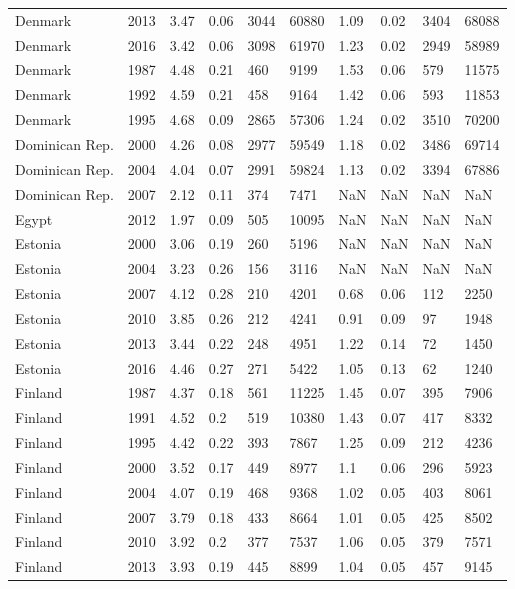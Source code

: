 \begin{tabular}{llllllllll}
Denmark & 2013 & 3.47 & 0.06 & 3044 & 60880 & 1.09 & 0.02 & 3404 & 68088 \\ 
Denmark & 2016 & 3.42 & 0.06 & 3098 & 61970 & 1.23 & 0.02 & 2949 & 58989 \\ 
Denmark & 1987 & 4.48 & 0.21 & 460 & 9199 & 1.53 & 0.06 & 579 & 11575 \\ 
Denmark & 1992 & 4.59 & 0.21 & 458 & 9164 & 1.42 & 0.06 & 593 & 11853 \\ 
Denmark & 1995 & 4.68 & 0.09 & 2865 & 57306 & 1.24 & 0.02 & 3510 & 70200 \\ 
Dominican Rep. & 2000 & 4.26 & 0.08 & 2977 & 59549 & 1.18 & 0.02 & 3486 & 69714 \\ 
Dominican Rep. & 2004 & 4.04 & 0.07 & 2991 & 59824 & 1.13 & 0.02 & 3394 & 67886 \\ 
Dominican Rep. & 2007 & 2.12 & 0.11 & 374 & 7471 & NaN & NaN & NaN & NaN \\ 
Egypt & 2012 & 1.97 & 0.09 & 505 & 10095 & NaN & NaN & NaN & NaN \\ 
Estonia & 2000 & 3.06 & 0.19 & 260 & 5196 & NaN & NaN & NaN & NaN \\ 
Estonia & 2004 & 3.23 & 0.26 & 156 & 3116 & NaN & NaN & NaN & NaN \\ 
Estonia & 2007 & 4.12 & 0.28 & 210 & 4201 & 0.68 & 0.06 & 112 & 2250 \\ 
Estonia & 2010 & 3.85 & 0.26 & 212 & 4241 & 0.91 & 0.09 & 97 & 1948 \\ 
Estonia & 2013 & 3.44 & 0.22 & 248 & 4951 & 1.22 & 0.14 & 72 & 1450 \\ 
Estonia & 2016 & 4.46 & 0.27 & 271 & 5422 & 1.05 & 0.13 & 62 & 1240 \\ 
Finland & 1987 & 4.37 & 0.18 & 561 & 11225 & 1.45 & 0.07 & 395 & 7906 \\ 
Finland & 1991 & 4.52 & 0.2 & 519 & 10380 & 1.43 & 0.07 & 417 & 8332 \\ 
Finland & 1995 & 4.42 & 0.22 & 393 & 7867 & 1.25 & 0.09 & 212 & 4236 \\ 
Finland & 2000 & 3.52 & 0.17 & 449 & 8977 & 1.1 & 0.06 & 296 & 5923 \\ 
Finland & 2004 & 4.07 & 0.19 & 468 & 9368 & 1.02 & 0.05 & 403 & 8061 \\ 
Finland & 2007 & 3.79 & 0.18 & 433 & 8664 & 1.01 & 0.05 & 425 & 8502 \\ 
Finland & 2010 & 3.92 & 0.2 & 377 & 7537 & 1.06 & 0.05 & 379 & 7571 \\ 
Finland & 2013 & 3.93 & 0.19 & 445 & 8899 & 1.04 & 0.05 & 457 & 9145 \\ 

\end{tabular}
